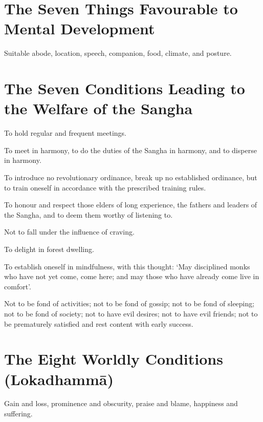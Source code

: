 \section*{The Seven Things Favourable to Mental Development}


Suitable abode, location, speech, companion, food, climate, and posture.\\
\mbox{}

\section*{The Seven Conditions Leading to the Welfare of the Sangha}

To hold regular and frequent meetings.

To meet in harmony, to do the duties of the Sangha in harmony, and to disperse
in harmony.

To introduce no revolutionary ordinance, break up no established ordinance, but
to train oneself in accordance with the prescribed training rules.

To honour and respect those elders of long experience, the fathers and leaders
of the Sangha, and to deem them worthy of listening to.

Not to fall under the influence of craving.

To delight in forest dwelling.

To establish oneself in mindfulness, with this thought: ‘May disciplined monks
who have not yet come, come here; and may those who have already come live in
comfort’.

Not to be fond of activities;
not to be fond of gossip;
not to be fond of sleeping;
not to be fond of society;
not to have evil desires;
not to have evil friends;
not to be prematurely satisfied and rest content with early success.


\section*{The Eight Worldly Conditions (Lokadhammā)}

Gain and loss, prominence and obscurity, praise and blame, happiness and suffering.\\
\mbox{}

\vspace*{-\baselineskip}

